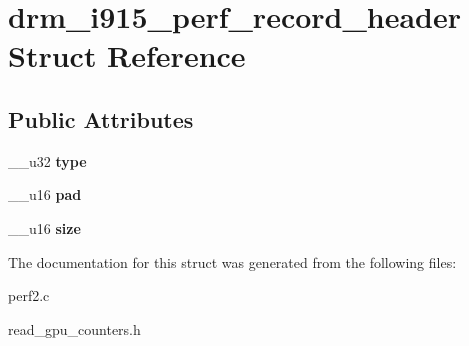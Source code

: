 \hypertarget{structdrm__i915__perf__record__header}{}\section{drm\+\_\+i915\+\_\+perf\+\_\+record\+\_\+header Struct Reference}
\label{structdrm__i915__perf__record__header}
\subsection*{Public Attributes}
\begin{DoxyCompactItemize}
\item 
\mbox{\label{structdrm__i915__perf__record__header_a0b06d22180ac5da6e9f32a7f17b2cc4f}} 
\+\_\+\+\_\+u32 {\bfseries type}
\item 
\mbox{\label{structdrm__i915__perf__record__header_a04d5241d95ac48f4c016d81d44d69d40}} 
\+\_\+\+\_\+u16 {\bfseries pad}
\item 
\mbox{\label{structdrm__i915__perf__record__header_ab07b124a47cdac7ed7d7f4549c7a977d}} 
\+\_\+\+\_\+u16 {\bfseries size}
\end{DoxyCompactItemize}


The documentation for this struct was generated from the following files\+:\begin{DoxyCompactItemize}
\item 
perf2.\+c\item 
read\+\_\+gpu\+\_\+counters.\+h\end{DoxyCompactItemize}

